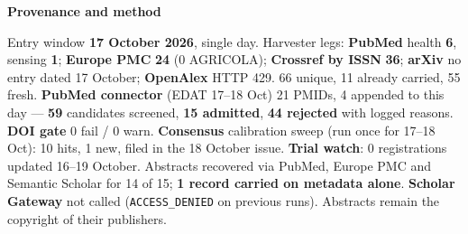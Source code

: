 \documentclass[10pt]{article}
\begin{document}
\begin{keybox}
{\sffamily\bfseries\footnotesize\color{Deep}Provenance and method}\\[1.2mm]
{\fontsize{7.2}{8.8}\selectfont
Entry window \textbf{17 October 2026}, single day. Harvester legs: \textbf{PubMed} health \textbf{6},
sensing \textbf{1}; \textbf{Europe PMC} \textbf{24} (0 AGRICOLA); \textbf{Crossref by ISSN} \textbf{36};
\textbf{arXiv} no entry dated 17 October; \textbf{OpenAlex} HTTP 429. 66 unique, 11 already carried, 55 fresh.
\textbf{PubMed connector} (EDAT 17--18 Oct) 21 PMIDs, 4 appended to this day --- \textbf{59} candidates screened,
\textbf{15 admitted}, \textbf{44 rejected} with logged reasons. \textbf{DOI gate} 0 fail / 0 warn. \textbf{Consensus}
calibration sweep (run once for 17--18 Oct): 10 hits, 1 new, filed in the 18 October issue. \textbf{Trial watch}: 0
registrations updated 16--19 October. Abstracts recovered via PubMed, Europe PMC and Semantic Scholar for 14 of 15;
\textbf{1 record carried on metadata alone}. \textbf{Scholar Gateway} not called (\texttt{ACCESS\_DENIED} on previous
runs). Abstracts remain the copyright of their publishers.\par}
\end{keybox}
\end{document}
